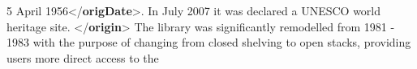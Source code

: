 \begin{shaded}
\hspace*{1em}5 April 1956{</\textbf{origDate}>}. In July 2007 it was declared a UNESCO\mbox{}\newline 
\hspace*{1em}\hspace*{1em}\hspace*{1em}\hspace*{1em} world heritage site. {</\textbf{origin}>}\mbox{}\newline 
{}\mbox{}\newline 
{}\mbox{}\newline 
\hspace*{1em}\mbox{}\newline 
\hspace*{1em}\hspace*{1em}\mbox{}\newline 
\hspace*{1em}\hspace*{1em}\hspace*{1em} The library was significantly remodelled from 1981 - 1983 with the\mbox{}\newline 
\hspace*{1em}\hspace*{1em}\hspace*{1em}\hspace*{1em}\hspace*{1em}\hspace*{1em}\hspace*{1em}\hspace*{1em} purpose of changing from closed shelving to open stacks, providing users more direct access to the\mbox{}\newline 

\end{shaded}
